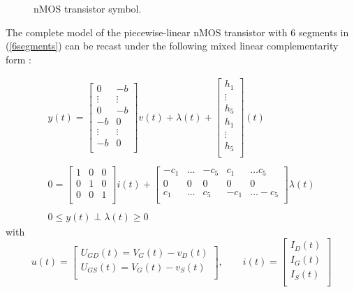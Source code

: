 \begin{figure}
  \centering
  
  \caption{nMOS transistor symbol.}
  \label{fig:NMOS}
\end{figure}

The complete model of the piecewise-linear nMOS transistor with 6 segments in (\ref{6segments}) can be recast under the following mixed linear complementarity form \cite{leenaerts-bokhoven1998}:

\begin{equation}
  \label{eq:68}
  \begin{array}{l}
  y(t) = 
  \left[\begin{array}{cc}
    0 & -b \\
    \vdots & \vdots  \\
     0 & -b \\
      -b &  0 \\
    \vdots & \vdots \\
     -b &  0 \\
  \end{array}\right]
  v(t)
  +
 \lambda(t)
  +
   \left[\begin{array}{c}
    h_1 \\
    \vdots \\
    h_5 \\
      h_1 \\
    \vdots \\
     h_5 \\
  \end{array}\right](t) \\ \\ 
 0 =
  \left[\begin{array}{ccc}
    1 & 0 & 0 \\
    0 & 1 & 0 \\
    0 & 0 & 1 \\
  \end{array}\right]
 i(t) 
 + 
 \left[\begin{array}{cccccc}
   -c_1  &\ldots & -c_5 & c_1 &\ldots c_5 \\
   0  & 0& 0 &0  & 0  \\
   c_1  &\ldots & c_5 & -c_1 &\ldots -c_5 \\
 \end{array}\right]
\lambda(t) \\ \\ 0 \leq y(t) \perp \lambda(t) \geq 0
\end{array}
\end{equation}
  with
\begin{equation}
  \label{eq:69}
  u(t) = 
  \left[\begin{array}{c}
    U_{GD}(t)=V_G(t)-v_D(t) \\
    U_{GS}(t)=V_G(t)-v_S(t) \\ 
  \end{array}\right],\quad\quad
i(t) = 
  \left[\begin{array}{c}
   I_D(t) \\
   I_G(t) \\
   I_S(t) \\
  \end{array}\right]
\end{equation}
